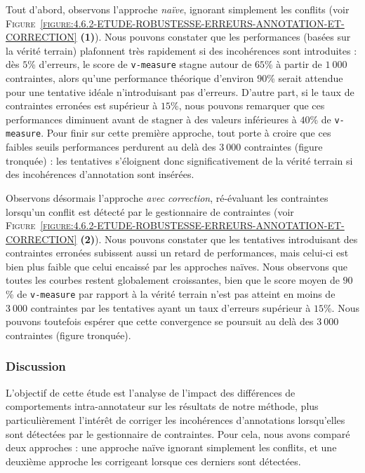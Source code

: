 			Tout d'abord, observons l'approche \textit{naïve}, ignorant simplement les conflits (voir \textsc{Figure~\ref{figure:4.6.2-ETUDE-ROBUSTESSE-ERREURS-ANNOTATION-ET-CORRECTION}} \textbf{(1)}).
			Nous pouvons constater que les performances (basées sur la vérité terrain) plafonnent très rapidement si des incohérences sont introduites : dès $5$\% d'erreurs, le score de \texttt{v-measure} stagne autour de $65$\% à partir de $1~000$ contraintes, alors qu'une performance théorique d'environ $90$\% serait attendue pour une tentative idéale n'introduisant pas d'erreurs.
			D'autre part, si le taux de contraintes erronées est supérieur à $15$\%, nous pouvons remarquer que ces performances diminuent avant de stagner à des valeurs inférieures à $40$\% de \texttt{v-measure}.
			Pour finir sur cette première approche, tout porte à croire que ces faibles seuils performances perdurent au delà des $3~000$ contraintes (figure tronquée) : les tentatives s'éloignent donc significativement de la vérité terrain si des incohérences d'annotation sont insérées.
			
			Observons désormais l'approche \textit{avec correction}, ré-évaluant les contraintes lorsqu'un conflit est détecté par le gestionnaire de contraintes (voir \textsc{Figure~\ref{figure:4.6.2-ETUDE-ROBUSTESSE-ERREURS-ANNOTATION-ET-CORRECTION}} \textbf{(2)}).
			Nous pouvons constater que les tentatives introduisant des contraintes erronées subissent aussi un retard de performances, mais celui-ci est bien plus faible que celui encaissé par les approches naïves.
			Nous observons que toutes les courbes restent globalement croissantes, bien que le score moyen de $90$\% de \texttt{v-measure} par rapport à la vérité terrain n'est pas atteint en moins de $3~000$ contraintes par les tentatives ayant un taux d'erreurs supérieur à $15$\%.
			Nous pouvons toutefois espérer que cette convergence se poursuit au delà des $3~000$ contraintes (figure tronquée).
		
		\subsubsection{Discussion}
		
			L'objectif de cette étude est l'analyse de l'impact des différences de comportements intra-annotateur sur les résultats de notre méthode, plus particulièrement l'intérêt de corriger les incohérences d'annotations lorsqu'elles sont détectées par le gestionnaire de contraintes.
			Pour cela, nous avons comparé deux approches : une approche naïve ignorant simplement les conflits, et une deuxième approche les corrigeant lorsque ces derniers sont détectées.
		
